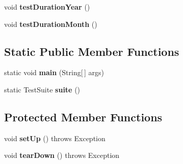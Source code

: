 \begin{DoxyCompactItemize}
\item 
\hypertarget{classorg_1_1joda_1_1time_1_1chrono_1_1_test_coptic_chronology_ac7ea82c1ec3cd37de2ffbb1d91ff792a}{void {\bfseries test\-Duration\-Year} ()}\label{classorg_1_1joda_1_1time_1_1chrono_1_1_test_coptic_chronology_ac7ea82c1ec3cd37de2ffbb1d91ff792a}

\item 
\hypertarget{classorg_1_1joda_1_1time_1_1chrono_1_1_test_coptic_chronology_ad08a29e73a88557786f144d918e59a11}{void {\bfseries test\-Duration\-Month} ()}\label{classorg_1_1joda_1_1time_1_1chrono_1_1_test_coptic_chronology_ad08a29e73a88557786f144d918e59a11}

\end{DoxyCompactItemize}
\subsection*{Static Public Member Functions}
\begin{DoxyCompactItemize}
\item 
\hypertarget{classorg_1_1joda_1_1time_1_1chrono_1_1_test_coptic_chronology_ae1aaeacb9c0ebd2812653a958590fda6}{static void {\bfseries main} (String\mbox{[}$\,$\mbox{]} args)}\label{classorg_1_1joda_1_1time_1_1chrono_1_1_test_coptic_chronology_ae1aaeacb9c0ebd2812653a958590fda6}

\item 
\hypertarget{classorg_1_1joda_1_1time_1_1chrono_1_1_test_coptic_chronology_a0d841a5d074da2ac11b5d63ff5da4358}{static Test\-Suite {\bfseries suite} ()}\label{classorg_1_1joda_1_1time_1_1chrono_1_1_test_coptic_chronology_a0d841a5d074da2ac11b5d63ff5da4358}

\end{DoxyCompactItemize}
\subsection*{Protected Member Functions}
\begin{DoxyCompactItemize}
\item 
\hypertarget{classorg_1_1joda_1_1time_1_1chrono_1_1_test_coptic_chronology_a69d8ee040dfcf070dbac63679cc8a6af}{void {\bfseries set\-Up} ()  throws Exception }\label{classorg_1_1joda_1_1time_1_1chrono_1_1_test_coptic_chronology_a69d8ee040dfcf070dbac63679cc8a6af}

\item 
\hypertarget{classorg_1_1joda_1_1time_1_1chrono_1_1_test_coptic_chronology_aef39e2e3fd64be53b724bdd36f4cc594}{void {\bfseries tear\-Down} ()  throws Exception }\label{classorg_1_1joda_1_1time_1_1chrono_1_1_test_coptic_chronology_aef39e2e3fd64be53b724bdd36f4cc594}

\end{DoxyCompactItemize}


